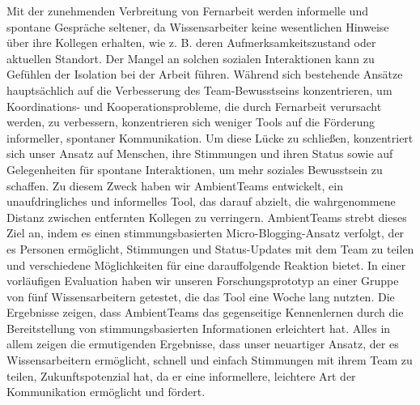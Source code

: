 \documentclass{seal_thesis}
\begin{document}
\begin{zusammenfassung}
    Mit der zunehmenden Verbreitung von Fernarbeit werden informelle und spontane Gespräche seltener, da Wissensarbeiter keine wesentlichen Hinweise über ihre Kollegen erhalten, wie z. B. deren Aufmerksamkeitszustand oder aktuellen Standort.  Der Mangel an solchen sozialen Interaktionen kann zu Gefühlen der Isolation bei der Arbeit führen. Während sich bestehende Ansätze hauptsächlich auf die Verbesserung des Team-Bewusstseins konzentrieren, um Koordinations- und Kooperationsprobleme, die durch Fernarbeit verursacht werden, zu verbessern, konzentrieren sich weniger Tools auf die Förderung informeller, spontaner Kommunikation. Um diese Lücke zu schließen, konzentriert sich unser Ansatz auf Menschen, ihre Stimmungen und ihren Status sowie auf Gelegenheiten für spontane Interaktionen, um mehr soziales Bewusstsein zu schaffen. Zu diesem Zweck haben wir AmbientTeams entwickelt, ein unaufdringliches und informelles Tool, das darauf abzielt, die wahrgenommene Distanz zwischen entfernten Kollegen zu verringern. AmbientTeams strebt dieses Ziel an, indem es einen stimmungsbasierten Micro-Blogging-Ansatz verfolgt, der es Personen ermöglicht, Stimmungen und Status-Updates mit dem Team zu teilen und verschiedene Möglichkeiten für eine darauffolgende Reaktion bietet. In einer vorläufigen Evaluation haben wir unseren Forschungsprototyp an einer Gruppe von fünf Wissensarbeitern getestet, die das Tool eine Woche lang nutzten. Die Ergebnisse zeigen, dass AmbientTeams das gegenseitige Kennenlernen durch die Bereitstellung von stimmungsbasierten Informationen erleichtert hat. Alles in allem zeigen die ermutigenden Ergebnisse, dass unser neuartiger Ansatz, der es Wissensarbeitern ermöglicht, schnell und einfach Stimmungen mit ihrem Team zu teilen, Zukunftspotenzial hat, da er eine informellere, leichtere Art der Kommunikation ermöglicht und fördert.
\end{zusammenfassung}

\setcounter{tocdepth}{1}
\tableofcontents
\listoffigures
\listoftables

\mainmatter









\begin{appendices}
    
\end{appendices}

\backmatter
\printbibliography
\end{document}
